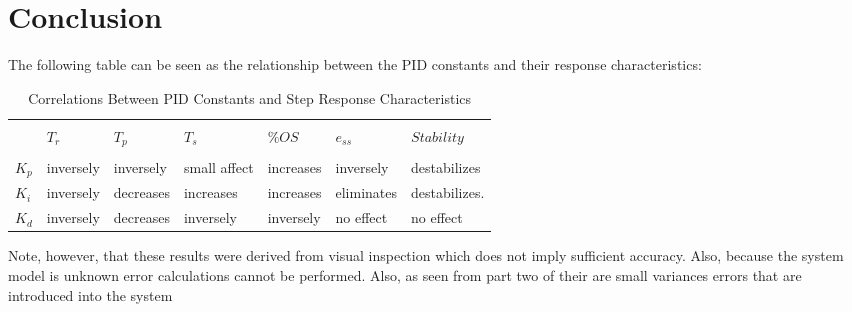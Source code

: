 \documentclass[main.tex]{subfile}
\begin{document}
\section{Conclusion} 
\label{sec:conclusion}

The following table can be seen as the relationship between the PID constants
and their response characteristics:

\begin{table}[H]
	\begin{tabularx}{\textwidth}{lXXXXXX}
		\toprule
		\\ & $T_r$ & $T_p$ & $T_s$ & $\%OS$ & $e_{ss}$ & $Stability$ 
		\\ \midrule
		\\ $K_p$ & inversely & inversely & small affect & increases  & inversely  & destabilizes
		\\ $K_i$ & inversely & decreases & increases & increases & eliminates & destabilizes.
		\\ $K_d$ & inversely & decreases & inversely & inversely & no effect & no effect
		\\ \bottomrule
	\end{tabularx}
	\caption{Correlations Between PID Constants and Step Response Characteristics}
	\label{tab:visualResults}
\end{table}

Note, however, that these results were derived from visual inspection which does
not imply sufficient accuracy. Also, because the system model is unknown error
calculations cannot be performed. Also, as seen from part two of
 their are small variances errors that are introduced into the
system 

\end{document}
